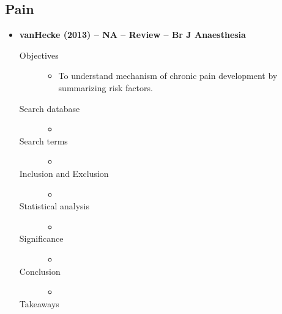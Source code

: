 \documentclass{article}
\begin{document}
\subsection{Pain}
\begin{itemize}	
	\item{\bf vanHecke (2013) -- NA -- Review -- Br J Anaesthesia} 
		\begin{description}
			\item[Objectives]\mbox{}\par
				\begin{itemize}
					\item To understand mechanism of chronic pain development by summarizing risk factors.
				\end{itemize}
			\item[Search database] \mbox{}\par
				\begin{itemize}
					\item 
				\end{itemize}
			\item[Search terms]\mbox{}\par
				\begin{itemize}
					\item 
				\end{itemize}
			\item[Inclusion and Exclusion] \mbox{}\par
				\begin{itemize}
					\item 
				\end{itemize}
			\item[Statistical analysis] \mbox{}\par
				\begin{itemize}
					\item 
				\end{itemize}
			\item[Significance] \mbox{}\par
				\begin{itemize}
					\item 
				\end{itemize}
			\item[Conclusion] \mbox{}\par
				\begin{itemize}
					\item 
				\end{itemize}
			\item[Takeaways] \mbox{}\par

\end{description}
\end{itemize}
\end{document}
